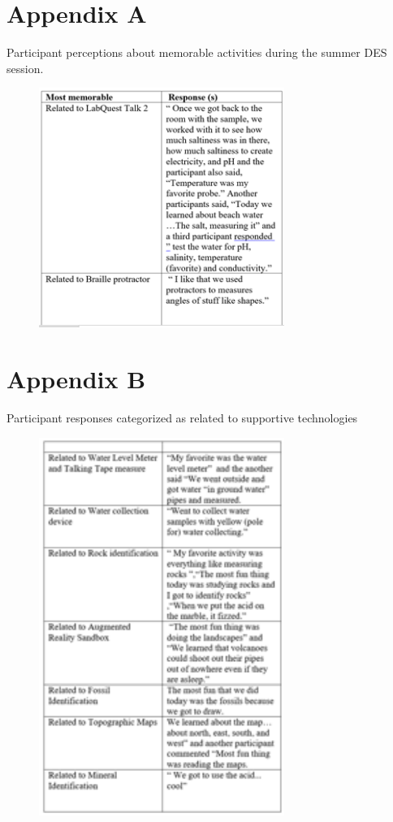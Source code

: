 \documentclass[11pt]{sig-alternate}
\begin{document}
\begin{large}
 


\endleftskipleftskip 
\endparindentparindentparindentparindent

\newpage

\section*{Appendix A}\par 

Participant perceptions about memorable activities during the summer DES session. 


\begin{figure}[htp]
    \centering
    \includegraphics[width=8cm]{Table1.png}

\end{figure}

\newpage

\section*{Appendix B}\par 

Participant responses categorized as related to supportive technologies
\begin{figure}[htp]
    \centering
    \includegraphics[width=8cm]{Table2.png}


\end{figure}
\end{large}
\end{document}
